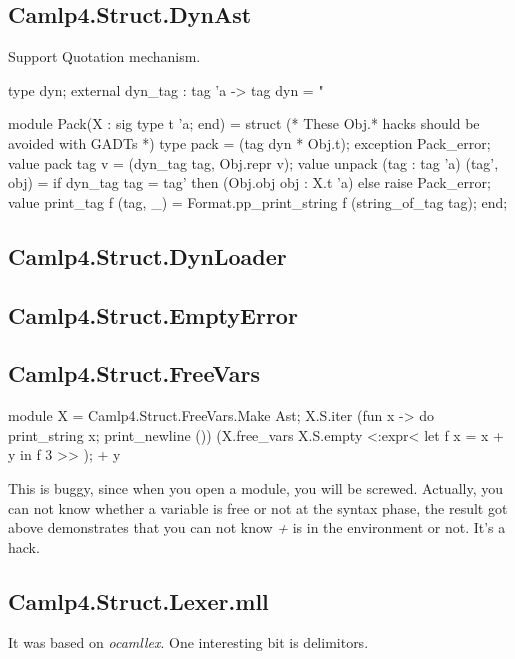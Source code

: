 \subsection{Camlp4.Struct.DynAst}
\label{Camlp4.Struct.DynAst}

Support Quotation mechanism.

\begin{ocamlcode}
  type dyn;
  external dyn_tag : tag 'a -> tag dyn = "%

  module Pack(X : sig type t 'a; end) = struct
    (* These Obj.* hacks should be avoided with GADTs *)
    type pack = (tag dyn * Obj.t);
    exception Pack_error;
    value pack tag v = (dyn_tag tag, Obj.repr v);
    value unpack (tag : tag 'a) (tag', obj) =
      if dyn_tag tag = tag' then (Obj.obj obj : X.t 'a) else raise Pack_error;
    value print_tag f (tag, _) = Format.pp_print_string f (string_of_tag tag);
  end;
  
\end{ocamlcode}

\subsection{Camlp4.Struct.DynLoader}
\label{Camlp4.Struct.DynLoader}

\subsection{Camlp4.Struct.EmptyError}
\label{Camlp4.Struct.EmptyError}

\subsection{Camlp4.Struct.FreeVars}
\label{Camlp4.Struct.FreeVars}

\begin{ocamlcode}
module X = Camlp4.Struct.FreeVars.Make Ast;  
X.S.iter (fun x -> do
      {print_string x;
           print_newline ()}) (X.free_vars X.S.empty <:expr< let f x = x  + y  in f 3 >> );
+
y
\end{ocamlcode}

This is buggy, since when you open a module, you will be
screwed. Actually, you can not know whether a variable is free or not
at the syntax phase, the result got above demonstrates that you can
not know \textit{+} is in the environment or not. It's a hack.

\subsection{Camlp4.Struct.Lexer.mll}
\label{Camlp4.Struct.Lexer.mll}
It was based on \textit{ocamllex}. One interesting bit is delimitors.

